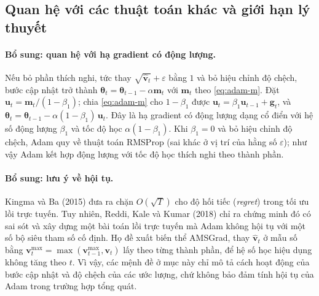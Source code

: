 \subsection{Quan hệ với các thuật toán khác và giới hạn lý thuyết}

\paragraph{Bổ sung: quan hệ với hạ gradient có động lượng.}
Nếu bỏ phần thích nghi, tức thay $\sqrt{\hat{\mathbf{v}}_t}+\varepsilon$ bằng $1$ và bỏ hiệu chỉnh độ chệch, bước cập nhật trở thành $\boldsymbol{\theta}_t=\boldsymbol{\theta}_{t-1}-\alpha\mathbf{m}_t$ với $\mathbf{m}_t$ theo \eqref{eq:adam-m}. Đặt $\mathbf{u}_t=\mathbf{m}_t/(1-\beta_1)$; chia \eqref{eq:adam-m} cho $1-\beta_1$ được $\mathbf{u}_t=\beta_1\mathbf{u}_{t-1}+\mathbf{g}_t$, và $\boldsymbol{\theta}_t=\boldsymbol{\theta}_{t-1}-\alpha(1-\beta_1)\,\mathbf{u}_t$. Đây là hạ gradient có động lượng dạng cổ điển với hệ số động lượng $\beta_1$ và tốc độ học $\alpha(1-\beta_1)$. Khi $\beta_1=0$ và bỏ hiệu chỉnh độ chệch, Adam quy về thuật toán RMSProp (sai khác ở vị trí của hằng số $\varepsilon$); như vậy Adam kết hợp động lượng với tốc độ học thích nghi theo thành phần.

\paragraph{Bổ sung: lưu ý về hội tụ.}
Kingma và Ba (2015) đưa ra chặn $O(\sqrt{T})$ cho độ hối tiếc (\emph{regret}) trong tối ưu lồi trực tuyến. Tuy nhiên, Reddi, Kale và Kumar (2018) chỉ ra chứng minh đó có sai sót và xây dựng một bài toán lồi trực tuyến mà Adam không hội tụ với một số bộ siêu tham số cố định. Họ đề xuất biến thể AMSGrad, thay $\hat{\mathbf{v}}_t$ ở mẫu số bằng $\mathbf{v}^{\max}_t=\max(\mathbf{v}^{\max}_{t-1},\mathbf{v}_t)$ lấy theo từng thành phần, để hệ số học hiệu dụng không tăng theo $t$. Vì vậy, các mệnh đề ở mục này chỉ mô tả cách hoạt động của bước cập nhật và độ chệch của các ước lượng, chứ không bảo đảm tính hội tụ của Adam trong trường hợp tổng quát.